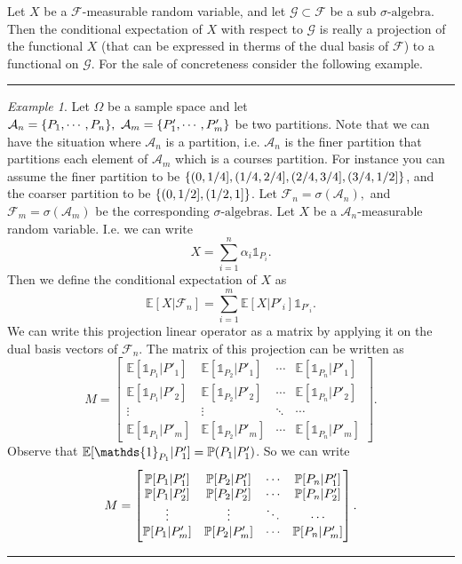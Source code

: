 \documentclass[11pt,a4paper]{article}
\theoremstyle{definition}
\theoremstyle{remark}
\newtheorem{example}{Example}
\newcommand{\E}{\mathbb{E}}
\begin{document}
	Let $ X $ be a $ \mathcal{F} $-measurable random variable, and let $ \mathcal{G} \subset\mathcal{F} $ be a sub $\sigma\text{-algebra}$. Then the conditional expectation of $ X $ with respect to $ \mathcal{G} $ is really a projection of the functional $ X $ (that can be expressed in therms of the dual basis of $ \mathcal{F} $) to a functional on $ \mathcal{G} $. For the sale of concreteness consider the following example.
	
	\vspace{5pt}
	\hrule
	\begin{example}
		Let $ \Omega $ be a sample space and let $ \mathcal{A}_n = \{P_1,\cdots,P_n\},\ \mathcal{A}_m = \{P'_1,\cdots,P'_m\}  $ be two partitions. Note that we can have the situation where $ \mathcal{A}_n $ is a partition, i.e. $ \mathcal{A}_n $ is the finer partition that partitions each element of $ \mathcal{A}_m $ which is a courses partition. For instance you can assume the finer partition to be $ \{(0,1/4],(1/4,2/4],(2/4,3/4],(3/4,1/2]\} $, and the coarser partition to be $ \{(0,1/2],(1/2,1]\} $. Let $ \mathcal{F}_n = \sigma(\mathcal{A}_n), $ and $ \mathcal{F}_m = \sigma(\mathcal{A}_m) $ be the corresponding $\sigma\text{-algebra}$s. Let $ X $ be a $ \mathcal{A}_n $-measurable random variable. I.e. we can write
		\[ X = \sum_{i=1}^n \alpha_i \mathds{1}_{P_i}. \]
		Then we define the conditional expectation of $ X $ as
		\[ \E[X|\mathcal{F}_n] = \sum_{i=1}^m \E[X|P'_i]\mathds{1}_{P'_i}. \]
		We can write this projection linear operator as a matrix by applying it on the dual basis vectors of $ \mathcal{F}_n $. The matrix of this projection can be written as
		\[ M = 
		\begin{bmatrix}
			\E[\mathds{1}_{P_1}|P'_1] & \E[\mathds{1}_{P_2}|P'_1] & \cdots & \E[\mathds{1}_{P_n}|P'_1] \\
			\E[\mathds{1}_{P_1}|P'_2] & \E[\mathds{1}_{P_2}|P'_2] & \cdots & \E[\mathds{1}_{P_n}|P'_2] \\
			\vdots & \vdots & \ddots & \cdots \\
			\E[\mathds{1}_{P_1}|P'_m] & \E[\mathds{1}_{P_2}|P'_m] & \cdots & \E[\mathds{1}_{P_n}|P'_m]
		\end{bmatrix}.
		\]
		Observe that $ \E[\mathds{1}_{P_1}|P_1'] = \prob(P_1|P_1') $. So we can write
		\[  M = 
		\begin{bmatrix}
			\mathbb{P}[P_1|P'_1] & \mathbb{P}[{P_2}|P'_1] & \cdots & \mathbb{P}[{P_n}|P'_1] \\
			\mathbb{P}[{P_1}|P'_2] & \mathbb{P}[{P_2}|P'_2] & \cdots & \mathbb{P}[{P_n}|P'_2] \\
			\vdots & \vdots & \ddots & \cdots \\
			\mathbb{P}[{P_1}|P'_m] & \mathbb{P}[{P_2}|P'_m] & \cdots & \mathbb{P}[{P_n}|P'_m]
		\end{bmatrix}. \]
	\end{example}
	\hrule
	\vspace{5pt}
	
\end{document}
